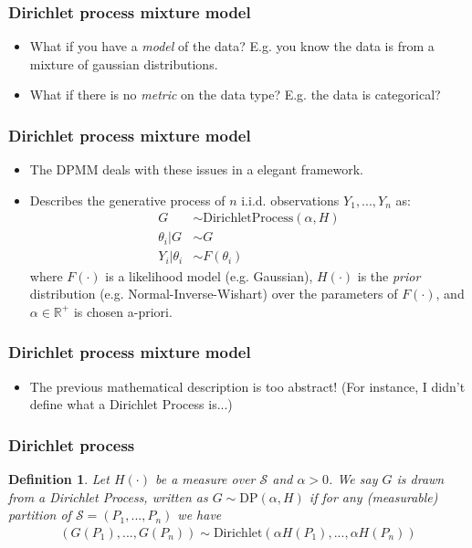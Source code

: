\documentclass{beamer}
\newtheorem{mydef}{Definition}
\newcommand{\R}{\ensuremath{\mathbb{R}}}
\newcommand{\Set}{\ensuremath{\mathcal{S}}}
\begin{document}
\begin{frame}
\frametitle{Dirichlet process mixture model}
\begin{itemize}
  \item What if you have a \emph{model} of the data? E.g. you know the 
    data is from a mixture of gaussian distributions. \pause

  \item What if there is no \emph{metric} on the data type? E.g. the data is
    categorical?
\end{itemize}
\end{frame}


\begin{frame}
\frametitle{Dirichlet process mixture model}
\begin{itemize}[<+->]
  \item The DPMM deals with these issues in a elegant framework.
  \item Describes the generative process
    of $n$ i.i.d. observations $Y_1, ..., Y_n$ as:
    \begin{align*}
      G &\sim \text{DirichletProcess}(\alpha, H) \\
      \theta_i | G &\sim G \\
      Y_i | \theta_i &\sim F(\theta_i)
    \end{align*} \pause
    where $F(\cdot)$ is a likelihood model (e.g. Gaussian),  $H(\cdot)$ is the
    \emph{prior} distribution (e.g. Normal-Inverse-Wishart) over the parameters
    of $F(\cdot)$, and $\alpha \in \R^{+}$ is chosen a-priori.
\end{itemize}
\end{frame}


\begin{frame}
\frametitle{Dirichlet process mixture model}
\begin{itemize}[<+->]
  \item The previous mathematical description is too abstract!
    \pause 
    (For instance, I didn't define what a 
    Dirichlet Process is...) 
    \pause
\end{itemize}
\end{frame}


\begin{frame}
\frametitle{Dirichlet process}
\pause
\begin{mydef}
Let $H(\cdot)$ be a measure over $\Set$ and $\alpha > 0$. We say $G$ is drawn
from a Dirichlet Process, written as $G \sim \text{DP}(\alpha, H)$ if for any
(measurable) partition of $\Set = (P_1, ..., P_n)$ we have
\begin{align*}
  (G(P_1), ..., G(P_n)) \sim \text{Dirichlet}(\alpha H(P_1), ..., \alpha H(P_n))
\end{align*}
\end{mydef}
\end{frame}
\end{document}
